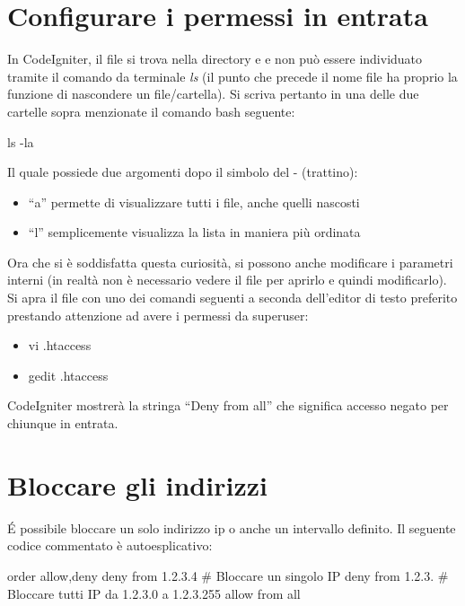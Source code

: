 \section*{Configurare i permessi in entrata}
In CodeIgniter, il file  si trova nella directory  e  e non può essere individuato tramite il comando da terminale \textit{ls} (il punto che precede il nome file ha proprio la funzione di nascondere un file/cartella). Si scriva pertanto in una delle due cartelle sopra menzionate il comando bash seguente:

\begin{code}
ls -la
\end{code}

Il quale possiede due argomenti dopo il simbolo del - (trattino):

\begin{itemize}
\item ``a'' permette di visualizzare tutti i file, anche quelli nascosti
\item ``l'' semplicemente visualizza la lista in maniera più ordinata
\end{itemize}

Ora che si è soddisfatta questa curiosità, si possono anche modificare i parametri interni (in realtà non è necessario vedere il file per aprirlo e quindi modificarlo). Si apra il file con uno dei comandi seguenti a seconda dell'editor di testo  preferito prestando attenzione ad avere i permessi da superuser:

\begin{itemize}
\item vi .htaccess
\item gedit .htaccess
\end{itemize}

CodeIgniter mostrerà la stringa ``Deny from all'' che significa accesso negato per chiunque in entrata.

\section*{Bloccare gli indirizzi}
\'E possibile bloccare un solo indirizzo ip o anche un intervallo definito. Il seguente codice commentato è autoesplicativo:

\begin{code}
order allow,deny
deny from 1.2.3.4           # Bloccare un singolo IP
deny from 1.2.3.            # Bloccare tutti IP da 1.2.3.0 a 1.2.3.255
allow from all
\end{code}

